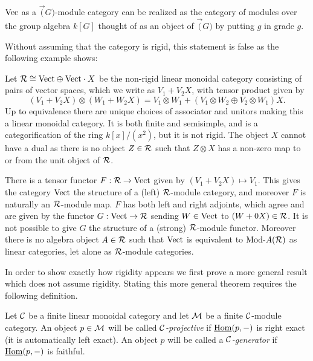 \documentclass{amsart}
\begin{document}
\begin{example}
$\Vec$ as a $\Vec(G)$-module category can be realized as the category of modules over the group algebra $k[G] $ thought of as an object of $\Vec(G)$ by putting $g$ in grade $g$.  
\end{example}

Without assuming that the category is rigid, this statement is false as the following example shows: 

\begin{example} \label{ex:lax-module}
	Let $\cR \cong \Vect \oplus \Vect \cdot X$ be the non-rigid linear monoidal category consisting of pairs of vector spaces, which we write as $V_1 + V_2 X$, with tensor product given by 
	\begin{equation*}
		(V_1 + V_2 X) \otimes (W_1 + W_2 X) = V_1 \otimes W_1  +  (V_1 \otimes W_2 \oplus V_2 \otimes W_1)X.
	\end{equation*} 
	Up to equivalence there are unique choices of associator and unitors making this a linear monoidal category. 
It is both finite and semisimple, and is a categorification of the ring $k[x]/(x^2)$, but it is not rigid. The object $X$ cannot have a dual as there is no object $Z \in \cR$ such that $Z \otimes X$ has a non-zero map to or from the unit object of $\cR$. 
	
	There is a tensor functor $F:\cR \to \Vect$ given by $(V_1 + V_2 X) \mapsto V_1$. This gives the category $\Vect$ the structure of a (left) $\cR$-module category, and moreover $F$ is naturally an $\cR$-module map. $F$ has both left and right adjoints, which agree and are given by the functor $G: \Vect \to \cR$ sending $W \in \Vect$ to $(W + 0 X) \in \cR$. It is not possible to give $G$ the structure of a (strong) $\cR$-module functor. Moreover there is no algebra object $A \in \cR$ such that $\Vect$ is equivalent to $\Mod{}{A}(\cR)$ as linear categories, let alone as $\cR$-module categories. 
\end{example}

In order to show exactly how rigidity appears we first prove a more general result which does not assume rigidity.  Stating this more general theorem requires the following definition.

\begin{definition}
	Let $\cC$ be a finite linear monoidal category and let $\cM$ be a finite $\cC$-module category. An object $p \in \cM$ will be called {\em $\cC$-projective} if $\IHom(p, -)$ is right exact (it is automatically left exact). An object $p$ will be called a {\em $\cC$-generator} if $\IHom(p,-)$ is faithful. 
\end{definition}
\end{document}
